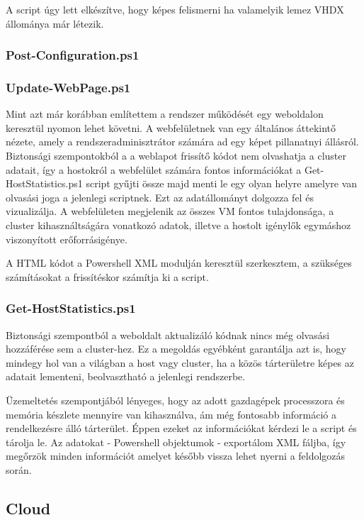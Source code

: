 \documentclass[12pt,oneside,justify,table]{book}
\begin{document}
A script úgy lett elkészítve, hogy képes felismerni ha valamelyik lemez VHDX állománya már létezik.

\subsubsection{Post-Configuration.ps1}

\subsubsection{Update-WebPage.ps1}
Mint azt már korábban említettem a rendszer működését egy weboldalon keresztül nyomon lehet követni. A webfelületnek van egy általános áttekintő nézete, amely a rendszeradminisztrátor számára ad egy képet pillanatnyi állásról. 
Biztonsági szempontokból a a weblapot frissítő kódot nem olvashatja a cluster adatait, így a hostokról a webfelület számára fontos információkat a Get-HostStatistics.ps1 script gyűjti össze majd menti le egy olyan helyre amelyre van olvasási joga a jelenlegi scriptnek. Ezt az adatállományt dolgozza fel és vizualizálja. A webfelületen megjelenik az összes VM fontos tulajdonsága, a cluster kihasználtságára vonatkozó adatok, illetve a hostolt igénylők egymáshoz viszonyított erőforrásigénye.

A HTML kódot a Powershell XML modulján keresztül szerkesztem, a szükséges számításokat a frissítéskor számítja ki a script.

\subsubsection{Get-HostStatistics.ps1}
Biztonsági szempontból a weboldalt aktualizáló kódnak nincs még olvasási hozzáférése sem a cluster-hez. Ez a megoldás egyébként garantálja azt is, hogy mindegy hol van a világban a host vagy cluster, ha a közös tárterületre képes az adatait lementeni, beolvasztható a jelenlegi rendszerbe. 

Üzemeltetés szempontjából lényeges, hogy az adott gazdagépek processzora és memória készlete mennyire van kihasználva, ám még fontosabb információ a rendelkezésre álló tárterület. Éppen ezeket az információkat kérdezi le a script és tárolja le. Az adatokat -  Powershell objektumok - exportálom XML fáljba, így megőrzök minden információt amelyet később vissza lehet nyerni a feldolgozás során.

\subsection{Cloud}
\noindent
\end{document}
